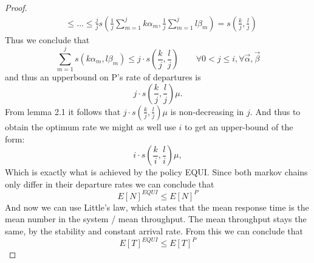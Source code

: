 \begin{proof}
\begin{align*}
    &\leq \dots \leq \frac{j}{j} s(\frac{1}{j}\sum_{m=1}^jk\alpha_m, \frac{1}{j}\sum_{m=1}^j l\beta_m) = s(\frac{k}{j}, \frac{l}{j})
\end{align*}
Thus we conclude that $$\sum_{m=1}^j s(k\alpha_m, l\beta_m) \leq j\cdot s(\frac{k}{j}, \frac{l}{j}) \qquad \forall 0 < j \leq i, \forall \vec{\alpha},\vec{\beta}$$
and thus an upperbound on P's rate of departures is $$j \cdot s \left(\frac{k}{j},\frac{l}{j}\right) \mu.$$ From lemma 2.1 it follows that $j\cdot s\left(\frac{k}{j},\frac{l}{j}\right)\mu$ is non-decreasing in $j$. And thus to obtain the optimum rate we might as well use $i$ to get an upper-bound of the form:
$$i\cdot s\left(\frac{k}{i},\frac{l}{i}\right)\mu,$$
Which is exactly what is achieved by the policy EQUI. Since both markov chains only differ in their departure rates we can conclude that
$$E[N]^{EQUI} \leq E[N]^P$$
And now we can use Little's law, which states that the mean response time is the mean number in the system / mean throughput. The mean throughput stays the same, by the stability and constant arrival rate. From this we can conclude that
$$E[T]^{EQUI} \leq E[T]^P$$
\end{proof}
